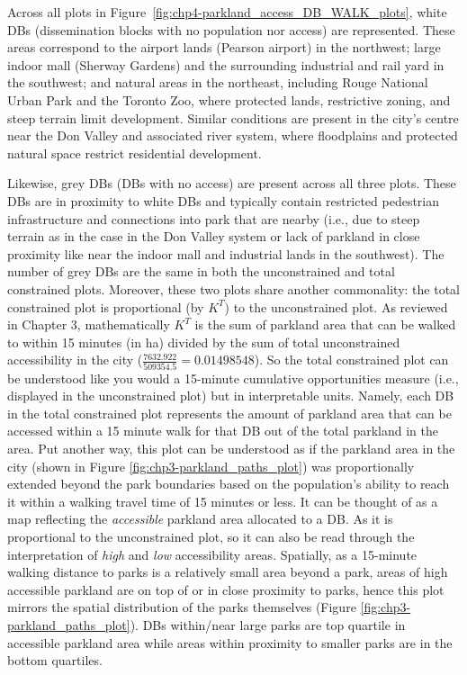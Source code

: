 \documentclass[
11pt, %
oneside, %
english, %
singlespacing, %
]{macthesis} %
\begin{document}
Across all plots in Figure~\ref{fig:chp4-parkland_access_DB_WALK_plots}, white DBs (dissemination blocks with no population nor access) are represented. These areas correspond to the airport lands (Pearson airport) in the northwest; large indoor mall (Sherway Gardens) and the surrounding industrial and rail yard in the southwest; and natural areas in the northeast, including Rouge National Urban Park and the Toronto Zoo, where protected lands, restrictive zoning, and steep terrain limit development. Similar conditions are present in the city's centre near the Don Valley and associated river system, where floodplains and protected natural space restrict residential development.

Likewise, grey DBs (DBs with no access) are present across all three plots. These DBs are in proximity to white DBs and typically contain restricted pedestrian infrastructure and connections into park that are nearby (i.e., due to steep terrain as in the case in the Don Valley system or lack of parkland in close proximity like near the indoor mall and industrial lands in the southwest). The number of grey DBs are the same in both the unconstrained and total constrained plots. Moreover, these two plots share another commonality: the total constrained plot is proportional (by \(K^T\)) to the unconstrained plot. As reviewed in Chapter 3, mathematically \(K^T\) is the sum of parkland area that can be walked to within 15 minutes (in ha) divided by the sum of total unconstrained accessibility in the city (\(\frac{7632.922}{509354.5} = 0.01498548\)). So the total constrained plot can be understood like you would a 15-minute cumulative opportunities measure (i.e., displayed in the unconstrained plot) but in interpretable units. Namely, each DB in the total constrained plot represents the amount of parkland area that can be accessed within a 15 minute walk for that DB out of the total parkland in the area. Put another way, this plot can be understood as if the parkland area in the city (shown in Figure \ref{fig:chp3-parkland_paths_plot}) was proportionally extended beyond the park boundaries based on the population's ability to reach it within a walking travel time of 15 minutes or less. It can be thought of as a map reflecting the \emph{accessible} parkland area allocated to a DB. As it is proportional to the unconstrained plot, so it can also be read through the interpretation of \emph{high} and \emph{low} accessibility areas. Spatially, as a 15-minute walking distance to parks is a relatively small area beyond a park, areas of high accessible parkland are on top of or in close proximity to parks, hence this plot mirrors the spatial distribution of the parks themselves (Figure \ref{fig:chp3-parkland_paths_plot}). DBs within/near large parks are top quartile in accessible parkland area while areas within proximity to smaller parks are in the bottom quartiles.
\end{document}

